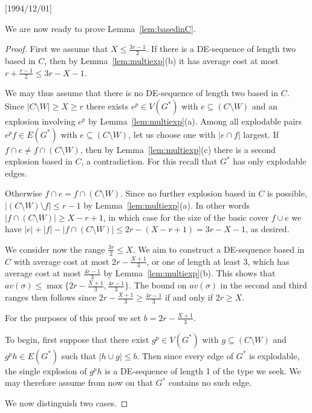 \NeedsTeXFormat{LaTeX2e}[1994/12/01]\documentclass[letterpaper, 11pt]{article}
\theoremstyle{definition}
\theoremstyle{remark}
\numberwithin{equation}{section}
\begin{document}
We are now ready to prove Lemma~\ref{lem:basedinC}.

\begin{proof} First we assume that $X\leq \frac{3r-1}{2}$.
  If there is a DE-sequence of length two based in $C$,
  then by Lemma~\ref{lem:multiexp}(b) it has average cost
  at most $r+\frac{r-1}{2} \leq 3r - X-1$.

  We may thus assume that there is no DE-sequence of length two based
  in $C$. Since $|C\setminus W| \geq X \geq r$ there exists $e^p \in V(G^*)$ with $e\subseteq (C\setminus W)$ and an explosion involving $e^p$ by Lemma~\ref{lem:multiexp}(a). 
  Among all explodable pairs $e^pf\in E(G^*)$ with $e\subseteq
  (C\setminus W)$, let us choose one with $|e\cap f|$ largest.
If $f\cap e \neq f\cap (C\setminus W)$, then by
Lemma~\ref{lem:multiexp}(c) there is a second explosion based in
$C$, a contradiction. For this recall that $G^*$ has only explodable edges.

Otherwise $f\cap e = f\cap (C\setminus W)$.  
Since no further explosion based in $C$ is possible,
$|(C\setminus W)\setminus f|\leq r-1$ by
Lemma~\ref{lem:multiexp}(a). In other words
$|f\cap (C\setminus W)|\geq X-r+1$, in which case
for the size of the basic cover $f\cup e$ we have $|e| + |f| - |f\cap
(C\setminus W)| \leq 2r -
(X-r+1) =3r-X-1$, as desired.

  We consider now the range $\frac{3r}{2} \leq X$.
We aim to construct a
DE-sequence based in $C$ with average cost at most
$2r-\frac{X+1}{3}$, or one of length
at least $3$, which has average cost at most $\frac{4r-1}{3}$ by
Lemma~\ref{lem:multiexp}(b). This shows that
$av(\sigma) \leq \max \{2r-\frac{X+1}{3}, \frac{4r-1}{3}\}$.
The bound on $av(\sigma)$  in the second and third ranges then
  follows since $2r - \frac{X+1}{3} \geq \frac{4r-1}{3}$ if and
  only if $2r \geq X$.

 For the purposes of this proof we set $b = 2r-\frac{X+1}{3}$.

To begin, first suppose that there exist $g^p\in V(G^*)$  with
$g\subseteq (C\setminus W)$ and
$g^ph\in E(G^*)$ such that  $|h\cup g| \leq  b$. Then since every edge
of $G^*$ is explodable, the single explosion of $g^ph$ is a
DE-sequence of length 1 of the type we seek. We may therefore assume
from now on that $G^*$ contains no such edge.

 We now distinguish two cases.

\medskip


\end{proof}
\end{document}
